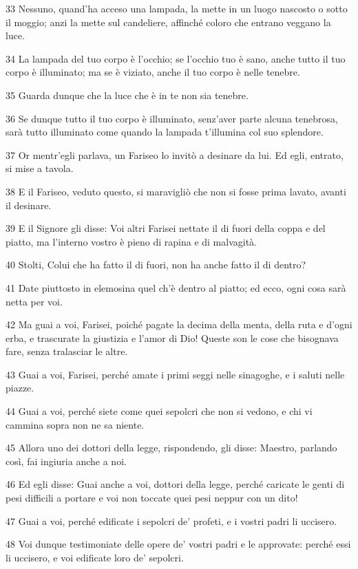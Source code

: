 \par 33 Nessuno, quand'ha acceso una lampada, la mette in un luogo nascosto o sotto il moggio; anzi la mette sul candeliere, affinché coloro che entrano veggano la luce.
\par 34 La lampada del tuo corpo è l'occhio; se l'occhio tuo è sano, anche tutto il tuo corpo è illuminato; ma se è viziato, anche il tuo corpo è nelle tenebre.
\par 35 Guarda dunque che la luce che è in te non sia tenebre.
\par 36 Se dunque tutto il tuo corpo è illuminato, senz'aver parte alcuna tenebrosa, sarà tutto illuminato come quando la lampada t'illumina col suo splendore.
\par 37 Or mentr'egli parlava, un Fariseo lo invitò a desinare da lui. Ed egli, entrato, si mise a tavola.
\par 38 E il Fariseo, veduto questo, si maravigliò che non si fosse prima lavato, avanti il desinare.
\par 39 E il Signore gli disse: Voi altri Farisei nettate il di fuori della coppa e del piatto, ma l'interno vostro è pieno di rapina e di malvagità.
\par 40 Stolti, Colui che ha fatto il di fuori, non ha anche fatto il di dentro?
\par 41 Date piuttosto in elemosina quel ch'è dentro al piatto; ed ecco, ogni cosa sarà netta per voi.
\par 42 Ma guai a voi, Farisei, poiché pagate la decima della menta, della ruta e d'ogni erba, e trascurate la giustizia e l'amor di Dio! Queste son le cose che bisognava fare, senza tralasciar le altre.
\par 43 Guai a voi, Farisei, perché amate i primi seggi nelle sinagoghe, e i saluti nelle piazze.
\par 44 Guai a voi, perché siete come quei sepolcri che non si vedono, e chi vi cammina sopra non ne sa niente.
\par 45 Allora uno dei dottori della legge, rispondendo, gli disse: Maestro, parlando così, fai ingiuria anche a noi.
\par 46 Ed egli disse: Guai anche a voi, dottori della legge, perché caricate le genti di pesi difficili a portare e voi non toccate quei pesi neppur con un dito!
\par 47 Guai a voi, perché edificate i sepolcri de' profeti, e i vostri padri li uccisero.
\par 48 Voi dunque testimoniate delle opere de' vostri padri e le approvate: perché essi li uccisero, e voi edificate loro de' sepolcri.
